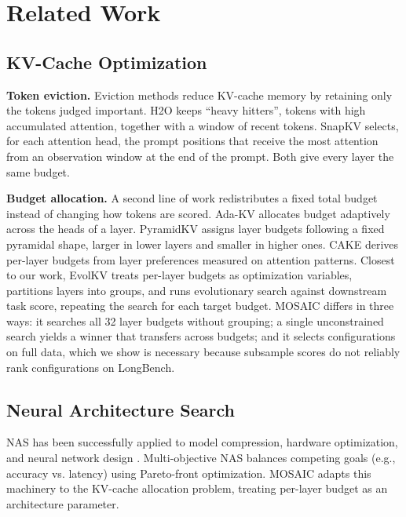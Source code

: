 \documentclass[11pt]{article}
\begin{document}
\section{Related Work}

\subsection{KV-Cache Optimization}

\textbf{Token eviction.} Eviction methods reduce KV-cache memory by retaining only the tokens judged important. H2O \citep{zhang2023h2o} keeps ``heavy hitters'', tokens with high accumulated attention, together with a window of recent tokens. SnapKV \citep{li2024snapkv} selects, for each attention head, the prompt positions that receive the most attention from an observation window at the end of the prompt. Both give every layer the same budget.

\textbf{Budget allocation.} A second line of work redistributes a fixed total budget instead of changing how tokens are scored. Ada-KV \citep{feng2024adakv} allocates budget adaptively across the heads of a layer. PyramidKV \citep{cai2024pyramidkv} assigns layer budgets following a fixed pyramidal shape, larger in lower layers and smaller in higher ones. CAKE \citep{qin2025cake} derives per-layer budgets from layer preferences measured on attention patterns. Closest to our work, EvolKV \citep{yu2025evolkv} treats per-layer budgets as optimization variables, partitions layers into groups, and runs evolutionary search against downstream task score, repeating the search for each target budget. MOSAIC differs in three ways: it searches all 32 layer budgets without grouping; a single unconstrained search yields a winner that transfers across budgets; and it selects configurations on full data, which we show is necessary because subsample scores do not reliably rank configurations on LongBench.

\subsection{Neural Architecture Search}

NAS has been successfully applied to model compression, hardware optimization, and neural network design \citep{elsken2018neural}. Multi-objective NAS balances competing goals (e.g., accuracy vs. latency) using Pareto-front optimization. MOSAIC adapts this machinery to the KV-cache allocation problem, treating per-layer budget as an architecture parameter.
\end{document}
